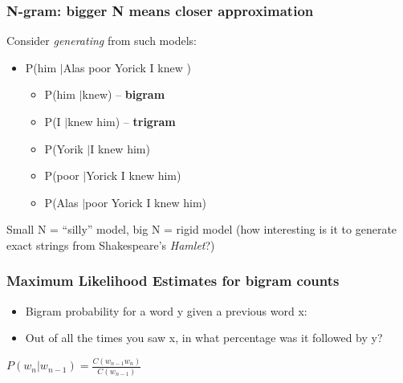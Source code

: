 \documentclass{beamer}
\begin{document}
\begin{frame}
\frametitle{N-gram: bigger N means closer approximation}

Consider {\it generating} from such models:

\vspace{0.2cm}

\begin{itemize}
\item P(him $\vert $Alas poor Yorick I knew )
\begin{itemize}
\item P(him $\vert $knew) -- {\bf bigram}
\item P(I $\vert $knew him) -- {\bf trigram}
\item P(Yorik $\vert $I knew him)
\item P(poor $\vert $Yorick I knew him)
\item P(Alas $\vert $poor Yorick I knew him)
\end{itemize}
\end{itemize}

\vspace{1 cm}

Small N = ``silly'' model, big N = rigid model (how interesting is it to generate exact strings from Shakespeare's {\it Hamlet}?)


\end{frame}

 \begin{frame}
 \frametitle{Maximum Likelihood Estimates for bigram counts}
 \begin{itemize}
 \item Bigram probability for a word y given a previous word x: 
 \item Out of all the times you saw x, in what percentage was it followed by y?
 \end{itemize}

 \vspace{0.5cm}

 \begin{center}
 $P(w_n\vert w_{n-1}) = \frac{C(w_{n-1}w_n)}{C(w_{n-1})}$
 \end{center}
 \end{frame}
\end{document}

